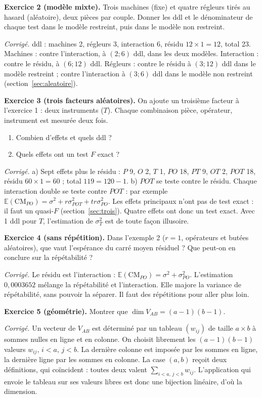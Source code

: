 \documentclass[11pt,a4paper]{article}
\theoremstyle{sj}
\theoremstyle{definition}
\theoremstyle{remark}
\newcommand{\E}{\mathbb{E}}
\newcommand{\CM}{\mathrm{CM}}
\begin{document}
\textbf{Exercice 2 (modèle mixte).} Trois machines (fixe) et quatre régleurs tirés au hasard (aléatoire), deux pièces par couple. Donner les ddl et le dénominateur de chaque test dans le modèle restreint, puis dans le modèle non restreint.

\emph{Corrigé.} ddl : machines 2, régleurs 3, interaction 6, résidu $12\times1=12$, total 23. Machines : contre l'interaction, à $(2;6)$ ddl, dans les deux modèles. Interaction : contre le résidu, à $(6;12)$ ddl. Régleurs : contre le résidu à $(3;12)$ ddl dans le modèle restreint ; contre l'interaction à $(3;6)$ ddl dans le modèle non restreint (section~\ref{sec:aleatoire}).

\textbf{Exercice 3 (trois facteurs aléatoires).} On ajoute un troisième facteur à l'exercice 1 : deux instruments ($T$). Chaque combinaison pièce, opérateur, instrument est mesurée deux fois.
\begin{enumerate}[label=\alph*),leftmargin=1.6em]
\item Combien d'effets et quels ddl ?
\item Quels effets ont un test $F$ exact ?
\end{enumerate}

\emph{Corrigé.} a) Sept effets plus le résidu : $P$ 9, $O$ 2, $T$ 1, $PO$ 18, $PT$ 9, $OT$ 2, $POT$ 18, résidu $60\times1=60$ ; total $119=120-1$. b) $POT$ se teste contre le résidu. Chaque interaction double se teste contre $POT$ : par exemple $\E(\CM_{PO})=\sigma^2+r\sigma^2_{POT}+tr\sigma^2_{PO}$. Les effets principaux n'ont pas de test exact : il faut un quasi-$F$ (section~\ref{sec:trois}). Quatre effets ont donc un test exact. Avec 1 ddl pour $T$, l'estimation de $\sigma_T^2$ est de toute façon illusoire.

\textbf{Exercice 4 (sans répétition).} Dans l'exemple 2 ($r=1$, opérateurs et butées aléatoires), que vaut l'espérance du carré moyen résiduel ? Que peut-on en conclure sur la répétabilité ?

\emph{Corrigé.} Le résidu est l'interaction : $\E(\CM_{PO})=\sigma^2+\sigma^2_{PO}$. L'estimation $0{,}0003652$ mélange la répétabilité et l'interaction. Elle majore la variance de répétabilité, sans pouvoir la séparer. Il faut des répétitions pour aller plus loin.

\textbf{Exercice 5 (géométrie).} Montrer que $\dim V_{AB}=(a-1)(b-1)$.

\emph{Corrigé.} Un vecteur de $V_{AB}$ est déterminé par un tableau $(w_{ij})$ de taille $a\times b$ à sommes nulles en ligne et en colonne. On choisit librement les $(a-1)(b-1)$ valeurs $w_{ij}$, $i<a$, $j<b$. La dernière colonne est imposée par les sommes en ligne, la dernière ligne par les sommes en colonne. La case $(a,b)$ reçoit deux définitions, qui coïncident : toutes deux valent $\sum_{i<a,\,j<b}w_{ij}$. L'application qui envoie le tableau sur ses valeurs libres est donc une bijection linéaire, d'où la dimension.
\end{document}
